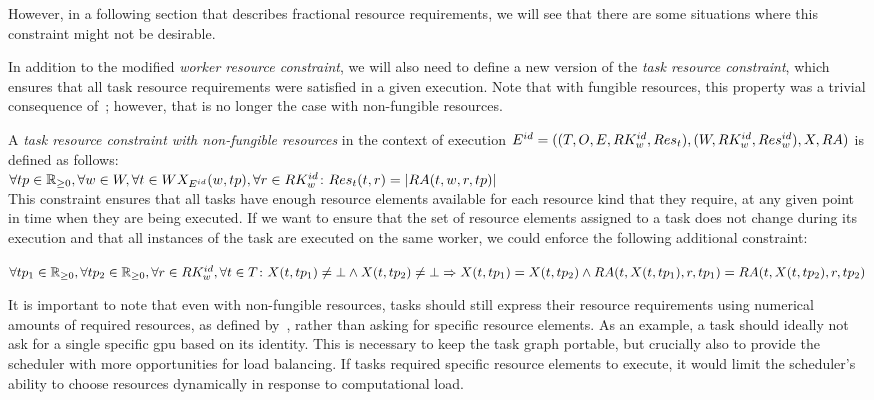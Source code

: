 However, in a following section that describes fractional resource requirements, we will see that
there are some situations where this constraint might not be desirable.

In addition to the modified \emph{worker resource constraint}, we will also need to define a new version of
the \emph{task resource constraint}, which ensures that all task resource requirements were satisfied in a
given execution. Note that with fungible resources, this property was a trivial consequence
of~; however, that is no longer the case with non-fungible resources.

\vspace{2mm}
A
\emph{task resource constraint with non-fungible resources} in the context of execution
$E^{id} = ((T, O, E, RK_w^{id}, Res_t), (W, RK_w^{id}, Res_w^{id}), X,
RA)$ is defined as
follows: \vspace{1mm}\\
$\forall tp\in\mathbb{R}_{\geq{}0}, \forall w\in{}W, \forall
	t\in{}WX_{E^{id}}(w, tp), \forall
	r\in{}RK_w^{id}\colon Res_t(t, r) =
	|RA(t, w, r, tp)|$ \\

This constraint ensures that all tasks have enough resource elements available for each resource
kind that they require, at any given point in time when they are being executed. If we want to
ensure that the set of resource elements assigned to a task does not change during its
execution and that all instances of the task are executed on the same worker, we could enforce the
following additional constraint:

\vspace{1mm}
$\forall tp_1\in\mathbb{R}_{\geq{}0}, \forall tp_2\in\mathbb{R}_{\geq{}0}, \forall r\in RK_w^{id}, \forall t\in{}T\colon
X(t, tp_1) \neq \bot \land X(t, tp_2) \neq \bot \Rightarrow X(t, tp_1) = X(t, tp_2) \land RA(t, X(t, tp_1), r, tp_1) =
RA(t, X(t, tp_2), r, tp_2)$

\vspace{1mm}It is important to note that even with non-fungible resources, tasks should still
express their resource requirements using numerical amounts of required resources, as defined
by~, rather than asking for specific resource elements. As an example, a
task should ideally not ask for a single specific \gls{gpu} based on its identity. This is
necessary to keep the task graph portable, but crucially also to provide the scheduler with more opportunities
for load balancing. If tasks required specific resource elements to execute, it would limit the
scheduler's ability to choose resources dynamically in response to computational load.


